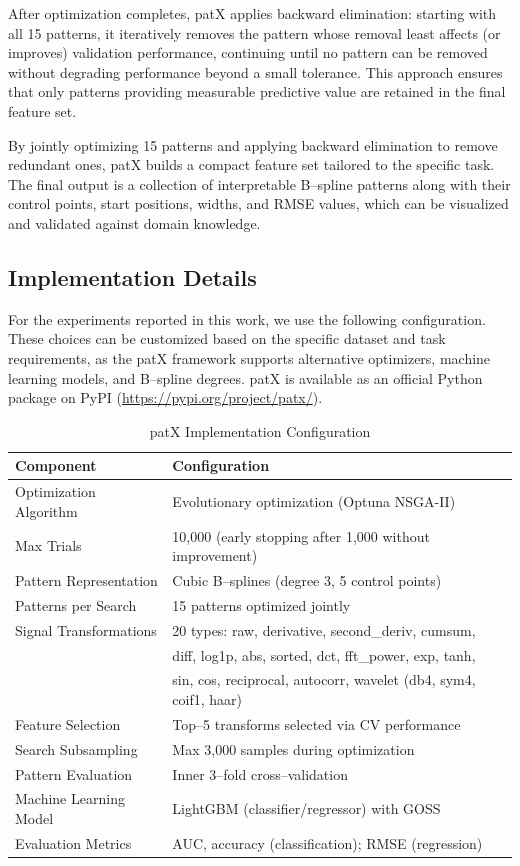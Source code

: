 \documentclass[11pt]{article}
\begin{document}
After optimization completes, patX applies backward elimination: starting with
all 15 patterns, it iteratively removes the pattern whose removal least affects
(or improves) validation performance, continuing until no pattern can be removed
without degrading performance beyond a small tolerance.
This approach ensures that only patterns providing measurable predictive value
are retained in the final feature set.

By jointly optimizing 15 patterns and applying backward elimination to remove
redundant ones, patX builds a compact feature set tailored to the specific task.
The final output is a collection of interpretable B--spline patterns
along with their control points, start positions, widths, and RMSE values,
which can be visualized and validated against domain knowledge.

\subsection{Implementation Details}
For the experiments reported in this work, we use the following configuration.
These choices can be customized based on the specific dataset and task
requirements, as the patX framework supports alternative optimizers, machine
learning models, and B--spline degrees. patX is available as an official Python package on PyPI (\url{https://pypi.org/project/patx/}).

\begin{table}[H]
\centering
\caption{patX Implementation Configuration}
\label{tab:implementation}
\begin{tabular}{ll}
\toprule
\textbf{Component} & \textbf{Configuration} \\
\midrule
Optimization Algorithm & Evolutionary optimization (Optuna NSGA-II) \\
Max Trials & 10,000 (early stopping after 1,000 without improvement) \\
Pattern Representation & Cubic B--splines (degree 3, 5 control points) \\
Patterns per Search & 15 patterns optimized jointly \\
Signal Transformations & 20 types: raw, derivative, second\_deriv, cumsum, \\
& diff, log1p, abs, sorted, dct, fft\_power, exp, tanh, \\
& sin, cos, reciprocal, autocorr, wavelet (db4, sym4, coif1, haar) \\
Feature Selection & Top--5 transforms selected via CV performance \\
Search Subsampling & Max 3,000 samples during optimization \\
Pattern Evaluation & Inner 3--fold cross--validation \\
Machine Learning Model & LightGBM (classifier/regressor) with GOSS \\
Evaluation Metrics & AUC, accuracy (classification); RMSE (regression) \\
\bottomrule
\end{tabular}
\end{table}
\end{document}
